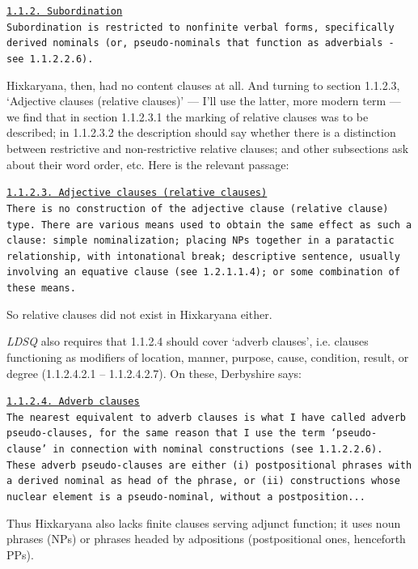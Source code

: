 \documentclass[output=paper,colorlinks,citecolor=brown
]{langscibook}
\begin{document}
\medskip
\parbox{0.9\textwidth}{\small
\underline{\underline{\texttt{1.1.2. Subordination}}}\\[0.5ex]
\texttt{Subordination is restricted to nonfinite verbal forms,
specifically derived nominals (or, pseudo-nominals that function
as adverbials - see 1.1.2.2.6).}}

\medskip\noindent
Hixkaryana, then, had no content clauses at all. And turning to
section 1.1.2.3, `Adjective clauses (relative clauses)' --- I'll
use the latter, more modern term --- we find that in section
1.1.2.3.1 the marking of relative clauses was to be described;
in 1.1.2.3.2 the description should say whether there is a
distinction between restrictive and non-restrictive relative clauses;
and other subsections ask about their word order, etc. Here is
the relevant passage:

\medskip
\parbox{0.9\textwidth}{\small
\underline{\underline{\texttt{1.1.2.3. Adjective clauses
(relative clauses)}}}\\[0.5ex]
\texttt{There is no construction of the adjective clause (relative
clause) type. There are various means used to obtain the same effect
as such a clause: simple nominalization; placing NPs together in a
paratactic relationship, with intonational break; descriptive
sentence, usually involving an equative clause (see 1.2.1.1.4);
or some combination of these means.}}

\medskip\noindent
So relative clauses did not exist in Hixkaryana either.

\textit{LDSQ} also requires that 1.1.2.4 should cover `adverb clauses',
i.e.  clauses functioning as modifiers of location, manner, purpose,
cause, condition, result, or degree (1.1.2.4.2.1 -- 1.1.2.4.2.7).
On these, Derbyshire says:

\medskip
\parbox{0.9\textwidth}{\small
\underline{\underline{\texttt{1.1.2.4. Adverb clauses}}}\\[0.5ex]
\texttt{The nearest equivalent to adverb clauses is what I have
called adverb pseudo-clauses, for the same reason that I use
the term `pseudo-clause' in connection with nominal constructions
(see 1.1.2.2.6). These adverb pseudo-clauses are either (i)
postpositional phrases with a derived nominal as head of
the phrase, or (ii) constructions whose nuclear element is a
pseudo-nominal, without a postposition...}}

\medskip\noindent
Thus Hixkaryana also lacks finite clauses serving adjunct function;
it uses noun phrases (NPs) or phrases headed by adpositions
(postpositional ones, henceforth PPs).
\end{document}
